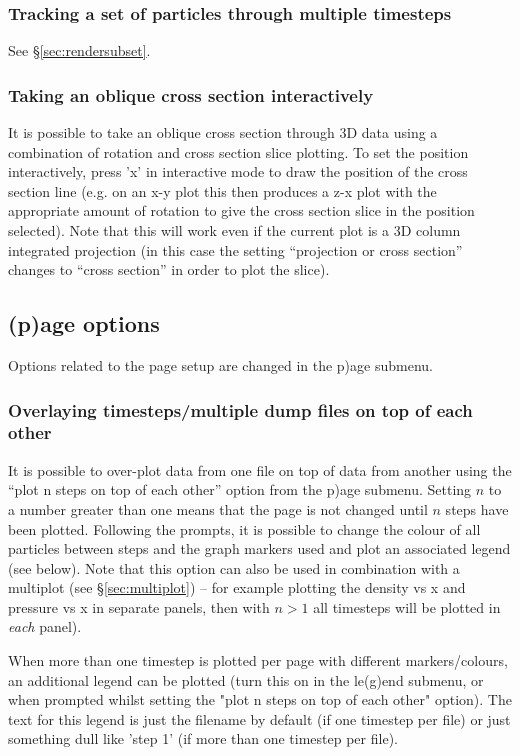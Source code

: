 \documentclass[a4paper,10pt]{article}
\begin{document}
\subsubsection{ Tracking a set of particles through multiple timesteps}
 See \S\ref{sec:rendersubset}.

\subsubsection{ Taking an oblique cross section interactively}
 \label{sec:obliquexsec}
 It is possible to take an oblique cross section through 3D data using a combination of rotation and cross section slice plotting. To set the position interactively, press 'x' in interactive mode to draw the position of the cross section line (e.g. on an x-y plot this then produces a z-x plot with the appropriate amount of rotation to give the cross section slice in the position selected). Note that this will work even if the current plot is a 3D column integrated projection (in this case the setting ``projection or cross section'' changes to ``cross section'' in order to plot the slice). 

\subsection{(p)age options}
\label{sec:optionspage}
 Options related to the page setup are changed in the p)age submenu.

\subsubsection{ Overlaying timesteps/multiple dump files on top of each other}
\label{sec:nstepsontopofeachother}
 It is possible to over-plot data from one file on top of data from another using the ``plot n steps on top of each other'' option from the p)age submenu. Setting $n$ to a number greater than one means that the page is not changed until $n$ steps have been plotted. Following the prompts, it is possible to change the colour of all particles between steps and the graph markers used and plot an associated legend (see below). Note that this option can also be used in combination with a multiplot (see \S\ref{sec:multiplot}) -- for example plotting the density vs x and pressure vs x in separate panels, then with $n > 1$ all timesteps will be plotted in \emph{each} panel). 

When more than one timestep is plotted per page with different markers/colours, an additional legend can be
plotted (turn this on in the le(g)end submenu, or when prompted whilst setting the "plot n steps on top of each other" option). The text for this legend is just the filename by default (if one timestep per file) or just something dull like 'step 1' (if more than one timestep per file). 
\end{document}
